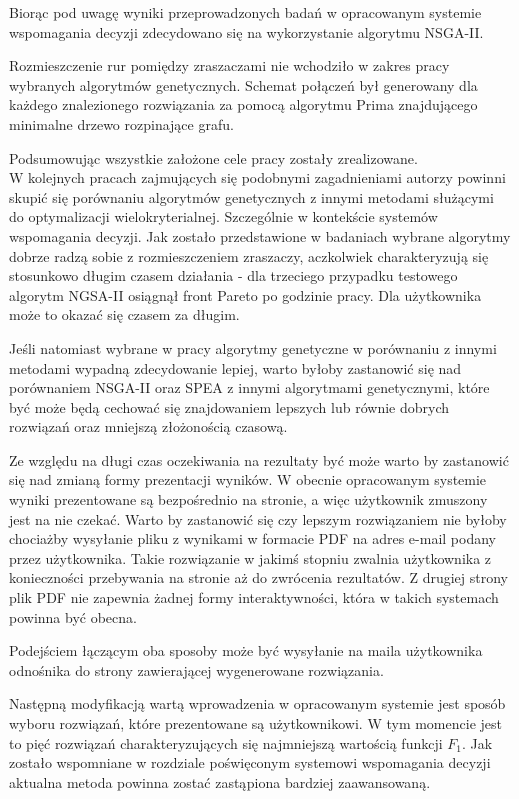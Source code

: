 \documentclass[twoside]{iisthesis}
\begin{document}
Biorąc pod uwagę wyniki przeprowadzonych badań w opracowanym systemie wspomagania decyzji zdecydowano się na wykorzystanie algorytmu NSGA-II.

Rozmieszczenie rur pomiędzy zraszaczami nie wchodziło w zakres pracy wybranych algorytmów genetycznych. Schemat połączeń był generowany dla każdego znalezionego rozwiązania za pomocą algorytmu Prima znajdującego minimalne drzewo rozpinające grafu.

Podsumowując wszystkie założone cele pracy zostały zrealizowane.\\

W kolejnych pracach zajmujących się podobnymi zagadnieniami autorzy powinni skupić się porównaniu algorytmów genetycznych z innymi metodami służącymi do optymalizacji wielokryterialnej. Szczególnie w kontekście systemów wspomagania decyzji. Jak zostało przedstawione w badaniach wybrane algorytmy dobrze radzą sobie z rozmieszczeniem zraszaczy, aczkolwiek charakteryzują się stosunkowo długim czasem działania - dla trzeciego przypadku testowego algorytm NGSA-II osiągnął front Pareto po godzinie pracy. Dla użytkownika może to okazać się czasem za długim. 

Jeśli natomiast wybrane w pracy algorytmy genetyczne w porównaniu z innymi metodami wypadną zdecydowanie lepiej, warto byłoby zastanowić się nad porównaniem NSGA-II oraz SPEA z innymi algorytmami genetycznymi, które być może będą cechować się znajdowaniem lepszych lub równie dobrych rozwiązań oraz mniejszą złożonością czasową.

Ze względu na długi czas oczekiwania na rezultaty być może warto by zastanowić się nad zmianą formy prezentacji wyników. W obecnie opracowanym systemie wyniki prezentowane są bezpośrednio na stronie, a więc użytkownik zmuszony jest na nie czekać. Warto by zastanowić się czy lepszym rozwiązaniem nie byłoby chociażby wysyłanie pliku z wynikami w formacie PDF na adres e-mail podany przez użytkownika. Takie rozwiązanie w jakimś stopniu zwalnia użytkownika z konieczności przebywania na stronie aż do zwrócenia rezultatów. Z drugiej strony plik PDF nie zapewnia żadnej formy interaktywności, która w takich systemach powinna być obecna.

Podejściem łączącym oba sposoby może być wysyłanie na maila użytkownika odnośnika do strony zawierającej wygenerowane rozwiązania.

Następną modyfikacją wartą wprowadzenia w opracowanym systemie jest sposób wyboru rozwiązań, które prezentowane są użytkownikowi. W tym momencie jest to pięć rozwiązań charakteryzujących się najmniejszą wartością funkcji $F_{1}$. Jak zostało wspomniane w rozdziale poświęconym systemowi wspomagania decyzji aktualna metoda powinna zostać zastąpiona bardziej zaawansowaną.
\end{document}
